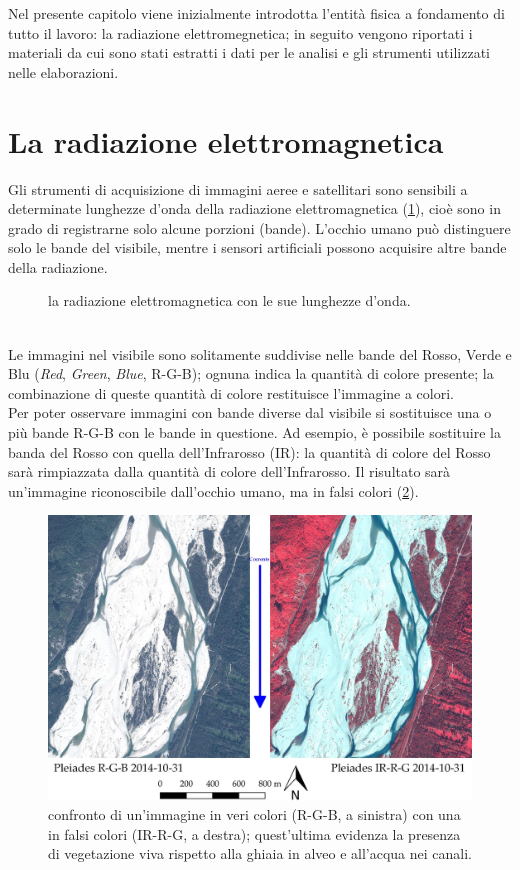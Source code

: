 Nel presente capitolo viene inizialmente introdotta l'entità fisica a fondamento di tutto il lavoro: la radiazione elettromegnetica;
in seguito vengono riportati i materiali da cui sono stati estratti i dati per le analisi e gli strumenti utilizzati nelle elaborazioni.


\section{La radiazione elettromagnetica}
Gli strumenti di acquisizione di immagini aeree e satellitari sono sensibili a determinate lunghezze d'onda della radiazione elettromagnetica (\cref{graph:el-mag-radiation}), cioè sono in grado di registrarne solo alcune porzioni (bande).
L'occhio umano può distinguere solo le bande del visibile, mentre i sensori artificiali possono acquisire altre bande della radiazione.
%
\begin{figure}
	\centering
	
	\caption[la radiazione elettromagnetica]{la radiazione elettromagnetica con le sue lunghezze d'onda.}
	\label{graph:el-mag-radiation}
\end{figure}
%
\\
Le immagini nel visibile sono solitamente suddivise nelle bande del Rosso, Verde e Blu (\emph{Red}, \emph{Green}, \emph{Blue}, R-G-B); ognuna indica la quantità di colore presente; la combinazione di queste quantità di colore restituisce l'immagine a colori.
\\
Per poter osservare immagini con bande diverse dal visibile si sostituisce una o più bande R-G-B con le bande in questione.
Ad esempio, è possibile sostituire la banda del Rosso con quella dell'Infrarosso (IR): la quantità di colore del Rosso sarà rimpiazzata dalla quantità di colore dell'Infrarosso.
Il risultato sarà un'immagine riconoscibile dall'occhio umano, ma in falsi colori (\cref{fig:confronto-bande-intro}).
%
\begin{figure}
	\centering
	\includegraphics[width=\textwidth]{files/confronto_bande_intro.jpeg}
	\caption[confronto immagini R-G-B e IR-R-G]{confronto di un'immagine in veri colori (R-G-B, a sinistra) con una in falsi colori (IR-R-G, a destra); quest'ultima evidenza la presenza di vegetazione viva rispetto alla ghiaia in alveo e all'acqua nei canali.}
	\label{fig:confronto-bande-intro}
\end{figure}
